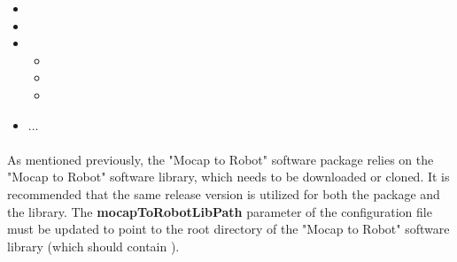 \documentclass[letterpaper]{article}
\begin{document}
\begin{itemize}
	\item {}
	\item {}
	\item {}
		\begin{itemize}
			\item {}
			\item {}
			\item {}
		\end{itemize}
	\item ...
\end{itemize}

\paragraph{}
As mentioned previously, the "Mocap to Robot" software package relies on the "Mocap to Robot" software library, which needs to be downloaded or cloned. It is recommended that the same release version is utilized for both the package and the library. The \textbf{mocapToRobotLibPath} parameter of the  configuration file must be updated to point to the root directory of the "Mocap to Robot" software library (which should contain ).
\end{document}
